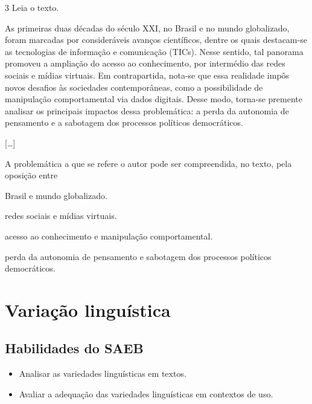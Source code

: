 \num{3} Leia o texto.

\begin{myquote}
As primeiras duas décadas do século XXI, no Brasil e no mundo
globalizado, foram marcadas por consideráveis avanços científicos,
dentre os quais destacam-se as tecnologias de informação e comunicação
(TICs). Nesse sentido, tal panorama promoveu a ampliação do acesso ao
conhecimento, por intermédio das redes sociais e mídias virtuais. Em
contrapartida, nota-se que essa realidade impôs novos desafios às
sociedades contemporâneas, como a possibilidade de manipulação
comportamental via dados digitais. Desse modo, torna-se premente
analisar os principais impactos dessa problemática: a perda da autonomia
de pensamento e a sabotagem dos processos políticos democráticos.
\end{myquote}

\begin{myquote}
{[}\ldots{]}
\end{myquote}


A problemática a que se refere o autor pode ser compreendida, no texto,
pela oposição entre

\begin{escolha}
\item Brasil e mundo globalizado.

\item redes sociais e mídias virtuais.

\item acesso ao conhecimento e manipulação comportamental.

\item perda da autonomia de pensamento e sabotagem dos processos políticos
democráticos.
\end{escolha}

\chapter{Variação linguística}

\section*{Habilidades do SAEB} 

\begin{itemize}
\item Analisar as variedades linguísticas em textos.
\item Avaliar a adequação das variedades linguísticas em contextos de uso.
\end{itemize}

